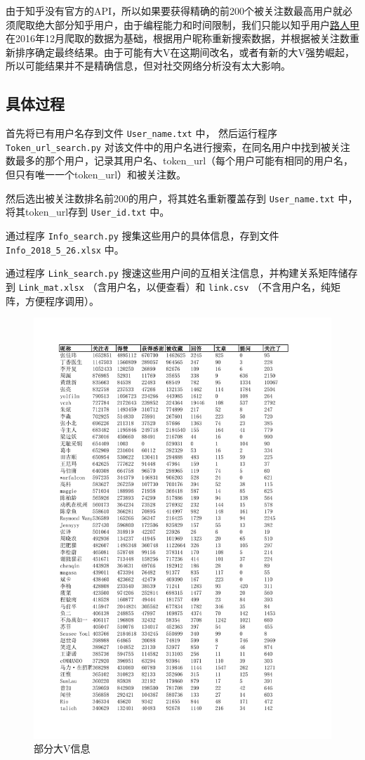 \documentclass[a4paper]{article}
\begin{document}
\begin{spacing}{1.5}
由于知乎没有官方的API，所以如果要获得精确的前200个被关注数最高用户就必须爬取绝大部分知乎用户，由于编程能力和时间限制，我们只能以知乎用户\href{https://www.zhihu.com/people/sgai/activities}{路人甲}在2016年12月爬取的数据为基础，根据用户昵称重新搜索数据，并根据被关注数重新排序确定最终结果。由于可能有大V在这期间改名，或者有新的大V强势崛起，所以可能结果并不是精确信息，但对社交网络分析没有太大影响。


\subsection{具体过程}
首先将已有用户名存到文件 \verb"User_name.txt" 中，
  然后运行程序  \verb"Token_url_search.py" 对该文件中的用户名进行搜索，在同名用户中找到被关注数最多的那个用户，记录其用户名、token\_url（每个用户可能有相同的用户名，但只有唯一一个token\_url）和被关注数。

  然后选出被关注数排名前200的用户，将其姓名重新覆盖存到 \verb"User_name.txt" 中，将其token\_url存到 \verb"User_id.txt" 中。

  通过程序 \verb"Info_search.py" 搜集这些用户的具体信息，存到文件 \verb"Info_2018_5_26.xlsx" 中。

  通过程序 \verb"Link_search.py" 搜速这些用户间的互相关注信息，并构建关系矩阵储存到 \verb"Link_mat.xlsx" （含用户名，以便查看）和 \verb"link.csv" （不含用户名，纯矩阵，方便程序调用）。
\begin{figure}[H]
  \centering
  \includegraphics[width=14cm]{fig/info_1.pdf}
  \caption{部分大V信息}\label{info1}
\end{figure}

\end{spacing}
\end{document}
